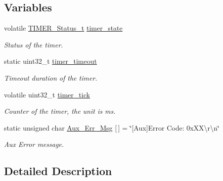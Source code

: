 \subsection*{Variables}
\begin{DoxyCompactItemize}
\item 
volatile \hyperlink{group___k_n_x___aux___exported___types_ga6ed3d972c6c5995cb3fe41995f121b41}{T\+I\+M\+E\+R\+\_\+\+Status\+\_\+t} \hyperlink{group___k_n_x___aux___private___variables_ga23c914a3038b7651aeb6bc1f444fe805}{timer\+\_\+state}\hypertarget{group___k_n_x___aux___private___variables_ga23c914a3038b7651aeb6bc1f444fe805}{}\label{group___k_n_x___aux___private___variables_ga23c914a3038b7651aeb6bc1f444fe805}

\begin{DoxyCompactList}\small\item\em Status of the timer. \end{DoxyCompactList}\item 
static uint32\+\_\+t \hyperlink{group___k_n_x___aux___private___variables_ga9425be3f8a3c77c3e1f30e8759fc65e8}{timer\+\_\+timeout}\hypertarget{group___k_n_x___aux___private___variables_ga9425be3f8a3c77c3e1f30e8759fc65e8}{}\label{group___k_n_x___aux___private___variables_ga9425be3f8a3c77c3e1f30e8759fc65e8}

\begin{DoxyCompactList}\small\item\em Timeout duration of the timer. \end{DoxyCompactList}\item 
volatile uint32\+\_\+t \hyperlink{group___k_n_x___aux___private___variables_ga8c702713be164664bf7d3c5f9cc9002d}{timer\+\_\+tick}\hypertarget{group___k_n_x___aux___private___variables_ga8c702713be164664bf7d3c5f9cc9002d}{}\label{group___k_n_x___aux___private___variables_ga8c702713be164664bf7d3c5f9cc9002d}

\begin{DoxyCompactList}\small\item\em Counter of the timer, the unit is ms. \end{DoxyCompactList}\item 
static unsigned char \hyperlink{group___k_n_x___aux___private___variables_gab56635544aea253fe5a75ded7dda1b2f}{Aux\+\_\+\+Err\+\_\+\+Msg} \mbox{[}$\,$\mbox{]} = \char`\"{}\mbox{[}Aux\mbox{]}Error Code\+: 0x\+X\+X\textbackslash{}r\textbackslash{}n\char`\"{}\hypertarget{group___k_n_x___aux___private___variables_gab56635544aea253fe5a75ded7dda1b2f}{}\label{group___k_n_x___aux___private___variables_gab56635544aea253fe5a75ded7dda1b2f}

\begin{DoxyCompactList}\small\item\em Aux Error message. \end{DoxyCompactList}\end{DoxyCompactItemize}


\subsection{Detailed Description}

